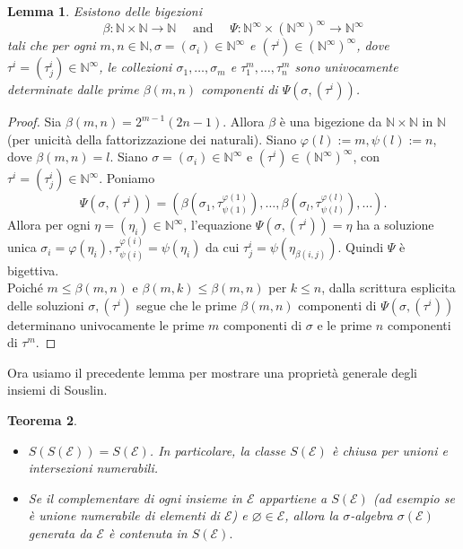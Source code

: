 \documentclass[a4paper, twoside,openright]{article}
\newcommand{\<}{\langle}
\renewcommand{\>}{\rangle}
\newtheorem{teo}{Teorema}[]
\newtheorem{lemma}[teo]{Lemma}
\begin{document}
\begin{lemma}
	Esistono delle bigezioni
	$$	\beta: \mathbb{N} \times \mathbb{N} \rightarrow \mathbb{N} \quad \text { and } \quad \Psi: \mathbb{N}^{\infty} \times\left(\mathbb{N}^{\infty}\right)^{\infty} \rightarrow \mathbb{N}^{\infty}
	$$
	tali che per ogni $m, n \in \mathbb{N}, \sigma=\left(\sigma_{i}\right) \in \mathbb{N}^{\infty}$ e $\left(\tau^{i}\right) \in\left(\mathbb{N}^{\infty}\right)^{\infty}$, dove $\tau^{i}=\left(\tau_{j}^{i}\right) \in \mathbb{N}^{\infty}$, le collezioni $\sigma_{1}, \ldots, \sigma_{m}$ e $\tau_{1}^{m}, \ldots, \tau_{n}^{m}$ sono univocamente determinate dalle prime $\beta(m, n)$ componenti di $\Psi\left(\sigma,\left(\tau^{i}\right)\right)$.
\end{lemma}	

\begin{proof}
	Sia $\beta(m, n)=2^{m-1}(2 n-1)$. Allora $\beta$ è una bigezione da $\mathbb{N} \times \mathbb{N}$ in $\mathbb{N}$ (per unicità della fattorizzazione dei naturali). Siano $\varphi(l):=m, \psi(l):=n$, dove $\beta(m, n)=l$. Siano $\sigma=\left(\sigma_{i}\right) \in \mathbb{N}^{\infty}$ e $\left(\tau^{i}\right) \in\left(\mathbb{N}^{\infty}\right)^{\infty}$, con $\tau^{i}=\left(\tau_{j}^{i}\right) \in \mathbb{N}^{\infty}$. Poniamo
	$$
	\Psi\left(\sigma,\left(\tau^{i}\right)\right)=\left(\beta\left(\sigma_{1}, \tau_{\psi(1)}^{\varphi(1)}\right), \ldots, \beta\left(\sigma_{l}, \tau_{\psi(l)}^{\varphi(l)}\right), \ldots\right) .
	$$
	Allora per ogni $\eta=\left(\eta_{i}\right) \in \mathbb{N}^{\infty}$, l'equazione $\Psi\left(\sigma,\left(\tau^{i}\right)\right)=\eta$ ha a soluzione unica $\sigma_{i}=\varphi\left(\eta_{i}\right),  \tau_{\psi(i)}^{\varphi(i)}=\psi(\eta_i)$ da cui $\tau_{j}^{i}=\psi\left(\eta_{\beta(i, j)}\right)$. Quindi $\Psi$ è bigettiva.\\
	Poiché $m \leq \beta(m, n)$ e $\beta(m, k) \leq \beta(m, n)$ per $k \leq n$, dalla scrittura esplicita delle soluzioni $\sigma, (\tau^i)$ segue che le prime $\beta(m, n)$ componenti di $\Psi\left(\sigma,\left(\tau^{i}\right)\right)$ determinano univocamente le prime $m$ componenti di $\sigma$ e le prime $n$ componenti di $\tau^{m}$.
	
\end{proof}

Ora usiamo il precedente lemma per mostrare una proprietà generale degli insiemi di Souslin.\\

\begin{teo}
	\hfill
	\begin{itemize}
		\item $S(S(\mathcal{E}))=S(\mathcal{E})$. In particolare, la classe $S(\mathcal{E})$ è chiusa per unioni e intersezioni numerabili.
		\item Se il complementare di ogni insieme in $\mathcal{E}$ appartiene a $S(\mathcal{E})$ (ad esempio se è unione numerabile di elementi di $\mathcal{E}$) e $\varnothing \in \mathcal{E}$, allora la $\sigma$-algebra $\sigma(\mathcal{E})$ generata da $\mathcal{E}$ è contenuta in $S(\mathcal{E}).$
	\end{itemize}
\end{teo}
\end{document}
